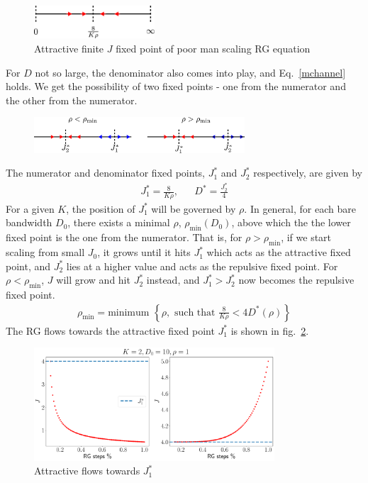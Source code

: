 \documentclass[12pt]{revtex4-2}
\begin{document}
\begin{figure}[!htb]
	\centering
	\includegraphics[width=0.4\textwidth]{rg_flow_pms.pdf}
	\caption{Attractive finite \(J\) fixed point of poor man scaling RG equation}
\end{figure}
For \(D\) not so large, the denominator also comes into play, and Eq.~\ref{mchannel} holds. We get the possibility of two fixed points - one from the numerator and the other from the numerator.
\begin{figure}[!htb]
	\centering
	\includegraphics[width=0.7\textwidth]{./rg_flow.pdf}
	\caption{}
	\label{rg_flow_general}
\end{figure}

The numerator and denominator fixed points, \(J_1^*\) and \(J_2^*\) respectively, are given by
\begin{align}
	J_1^* = \frac{8}{K \rho}, && D^* = \frac{J_2^*}{4}
\end{align}
For a given \(K\), the position of \(J_1^*\) will be governed by \(\rho\). In general, for each bare bandwidth \(D_0\), there exists a minimal \(\rho\), $\rho_\text{min}(D_0)$, above which the the lower fixed point is the one from the numerator. That is, for \(\rho > \rho_\text{min}\), if we start scaling from small \(J_0\), it grows until it hits \(J_1^*\) which acts as the attractive fixed point, and \(J_2^*\) lies at a higher value and acts as the repulsive fixed point. For \(\rho < \rho_\text{min}\), \(J\) will grow and hit \(J_2^*\) instead, and \(J_1^* > J_2^*\) now becomes the repulsive fixed point.
\begin{align}
	\rho_\text{min} = \text{minimum }\left\{\rho, \text{ such that } \frac{8}{K \rho} < 4 D^*(\rho)\right\}
\end{align}
The RG flows towards the attractive fixed point \(J_1^*\) is shown  in fig.~\ref{rg_flow_K-2}.
\begin{figure}[!htpb]
	\centering
	\includegraphics[width=0.8\textwidth]{../numerics/rg_flow_K=2.pdf}
	\caption{Attractive flows towards \(J_1^*\)}
	\label{rg_flow_K-2}
\end{figure}
\end{document}
